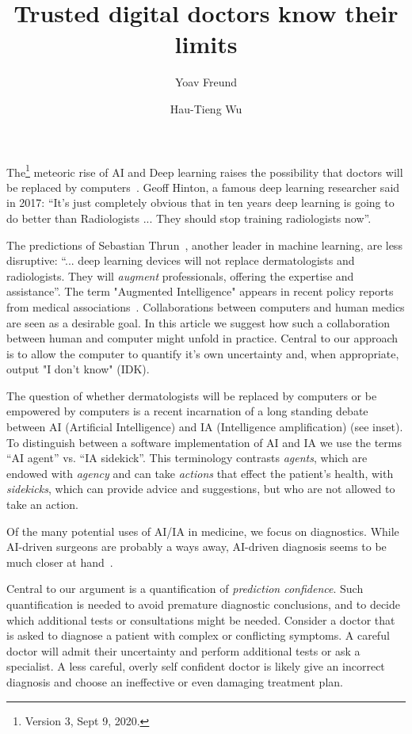 \documentclass[11pt]{pnas-new}
\author[1]{Yoav Freund}
\author[2]{Hau-Tieng Wu}
\affil[1]{UCSD, Computer Science, San Diego, 92093, United States}
\affil[2]{Duke, Mathematics and Statistical Science, Durham, 27708, USA}
\title{Trusted digital doctors know their limits}
\newlength{\strutheight}
\begin{document}
\settoheight{\strutheight}{\strut}

 
\maketitle


The\footnote{Version 3, Sept 9, 2020.} meteoric rise of AI and Deep learning raises the possibility that
doctors will be replaced by computers~\cite{Mukherjee2017}. Geoff Hinton,
a famous deep learning researcher said in 2017: ``It's just completely
obvious that in ten years deep learning is going to do better than
Radiologists ... They should stop training radiologists now''.

The predictions of Sebastian
Thrun~\cite{Mukherjee2017,esteva2017dermatologist}, another leader in
machine learning, are less disruptive: ``... deep learning devices
will not replace dermatologists and radiologists. They will {\em
  augment} professionals, offering the expertise and assistance''. 
  The term "Augmented Intelligence" appears in recent 
  policy reports from medical associations~\cite{american2019augmented,AAD2019augmented}. Collaborations between computers and human medics are seen as a desirable goal.
  In this article we suggest how such a collaboration between human and computer might unfold in practice. Central to our approach is to allow the computer to quantify it's own uncertainty and, when appropriate, output "I don't know" (IDK).
 
 The question of whether dermatologists will be
replaced by computers or be empowered by computers is a recent
incarnation of a long standing debate between AI (Artificial Intelligence) and IA
(Intelligence amplification) (see inset). To
distinguish between a software implementation of AI and IA we use the terms ``AI agent'' vs. ``IA
sidekick''. This terminology contrasts {\em agents}, which are endowed
with {\em agency} and can take {\em actions} that effect the patient's
health, with {\em sidekicks}, which can provide advice and suggestions,
but who are not allowed to take an action.

Of the many potential uses of AI/IA in medicine, we focus on diagnostics.
While AI-driven surgeons are probably a ways away, AI-driven diagnosis seems
to be much closer at hand~\cite{topol2019deep}. 

Central to our argument is a quantification of {\em prediction
  confidence}. Such quantification is needed to avoid premature
diagnostic conclusions, and to decide which additional tests or
consultations might be needed. Consider a doctor that is asked
to diagnose a patient with complex or conflicting symptoms. A careful
doctor will admit their uncertainty and perform additional tests or
ask a specialist. A less careful, overly self confident doctor is
likely give an incorrect diagnosis and choose an ineffective or even damaging
treatment plan.
\end{document}
